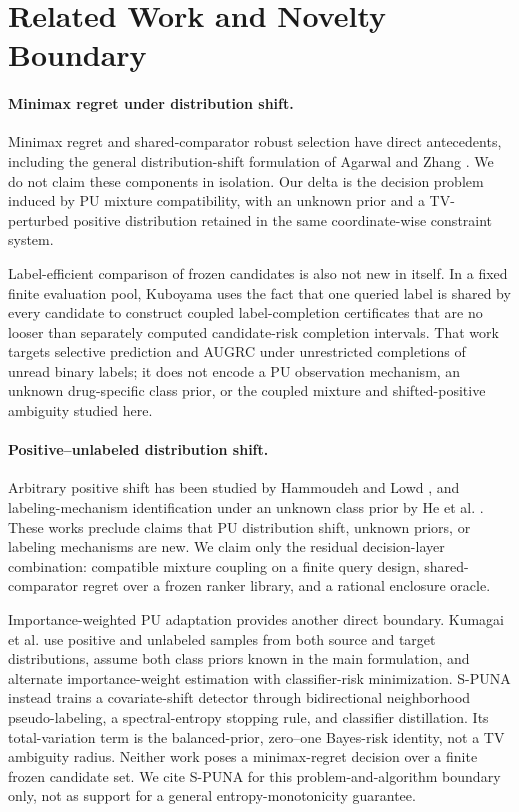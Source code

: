 \documentclass[preprint,review,12pt]{elsarticle}
\begin{document}
\section{Related Work and Novelty Boundary}

\paragraph{Minimax regret under distribution shift.}
Minimax regret and shared-comparator robust selection have direct antecedents,
including the general distribution-shift formulation of Agarwal and Zhang
\citep{agarwal2022minimax}. We do not claim these components in isolation. Our
delta is the decision problem induced by PU mixture compatibility, with an
unknown prior and a TV-perturbed positive distribution retained in the same
coordinate-wise constraint system.

Label-efficient comparison of frozen candidates is also not new in itself.
In a fixed finite evaluation pool, Kuboyama
\citep{kuboyama2026labelsdoesmodelchoice}
uses the fact that one queried label is shared by every candidate to construct
coupled label-completion certificates that are no looser than separately
computed candidate-risk completion intervals. That work targets selective
prediction and AUGRC under unrestricted completions of unread binary labels;
it does not encode a PU observation mechanism, an unknown drug-specific class
prior, or the coupled mixture and shifted-positive ambiguity studied here.

\paragraph{Positive--unlabeled distribution shift.}
Arbitrary positive shift has been studied by Hammoudeh and Lowd
\citep{hammoudeh2020arbitrary}, and labeling-mechanism identification under an
unknown class prior by He et al. \citep{he2026labeling}. These works preclude
claims that PU distribution shift,
unknown priors, or labeling mechanisms are new. We claim only the residual
decision-layer combination: compatible mixture coupling on a finite query
design, shared-comparator regret over a frozen ranker library, and a rational
enclosure oracle.

Importance-weighted PU adaptation provides another direct boundary. Kumagai
et al. \citep{pmlr-v258-kumagai25a} use positive and unlabeled samples from both source
and target distributions, assume both class priors known in the main
formulation, and alternate importance-weight estimation with classifier-risk
minimization. S-PUNA \citep{gabetni2026spuna} instead trains a covariate-shift
detector through bidirectional neighborhood pseudo-labeling, a spectral-entropy
stopping rule, and classifier distillation. Its total-variation term is the
balanced-prior, zero--one Bayes-risk identity, not a TV ambiguity radius.
Neither work poses a minimax-regret decision over a finite frozen candidate
set. We cite S-PUNA for this problem-and-algorithm boundary only, not as support
for a general entropy-monotonicity guarantee.
\end{document}

